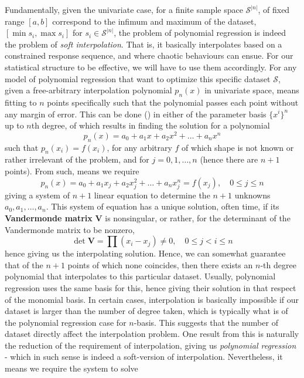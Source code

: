 Fundamentally, given the univariate case, for a finite sample space $\mathcal{S}^{\lvert n\rvert}$, of fixed range $[a,b]$ correspond to the infimum and maximum of the dataset, $[\min s_{i},\max s_{i}]$ for $s_{i}\in \mathcal{S}^{\lvert n\rvert}$, the problem of polynomial regression is indeed the problem of \textit{soft interpolation}. That is, it basically interpolates based on a constrained response sequence, and where chaotic behaviours can ensue. For our statistical structure to be effective, we will have to use them accordingly. For any model of polynomial regression that want to optimize this specific dataset $\mathcal{S}$, given a free-arbitrary interpolation polynomial $p_{n}(x)$ in univariate space, means fitting to $n$ points specifically such that the polynomial passes each point without any margin of error. This can be done (\cite{McArtneyInterpolation2003}) in either of the parameter basis $\{x^{i}\}^{n}$ up to $n$th degree, of which results in finding the solution for a polynomial 
\begin{equation}
    p_{n}(x) = a_{0} + a_{1} x + a_{2} x^{2} + \dots + a_{n}x^{n} 
\end{equation}
such that $p_{n}(x_{i})=f(x_{i})$, for any arbitrary $f$ of which shape is not known or rather irrelevant of the problem, and for $j=0,1,\dots,n$ (hence there are $n+1$ points). From such, means we require 
\begin{equation}
    p_{n}(x) = a_{0} + a_{1} x_{j} + a_{2} x^{2}_{j} + \dots + a_{n}x^{n}_{j} = f(x_{j}), \quad 0 \leq j \leq n 
\end{equation}
giving a system of $n+1$ linear equation to determine the $n+1$ unknowns $a_{0},a_{1},\dots,a_{n}$. This system of equation has a unique solution, often time, if its \textbf{Vandermonde matrix} $\mathbf{V}$ is nonsingular, or rather, for the determinant of the Vandermonde matrix to be nonzero, \begin{equation}
    \det{\mathbf{V}} = \prod (x_{i}-x_{j}) \ne 0 , \quad 0 \leq j < i \leq n 
\end{equation}
hence giving us the interpolating solution. Hence, we can somewhat guarantee that of the $n+1$ points of which none coincides, then there exists an $n$-th degree polynomial that interpolates to this particular dataset. Usually, polynomial regression uses the same basis for this, hence giving their solution in that respect of the monomial basis. In certain cases, interpolation is basically impossible if our dataset is larger than the number of degree taken, which is typically what is of the polynomial regression case for $n$-basis. This suggests that the number of dataset directly affect the interpolation problem. One result from this is naturally the reduction of the requirement of interpolation, giving us \textit{polynomial regression} - which in such sense is indeed a soft-version of interpolation. Nevertheless, it means we require the system to solve 
